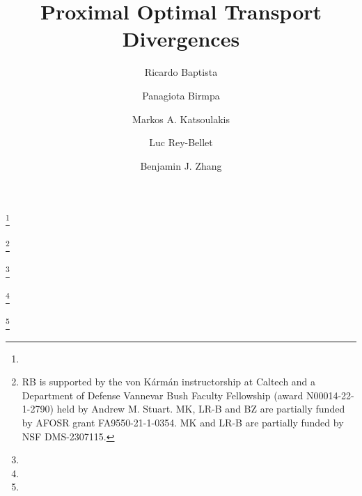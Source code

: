 \documentclass{amsart}
\theoremstyle{definition}
\theoremstyle{remark}
\numberwithin{equation}{section}
\begin{document}
\title{Proximal Optimal Transport Divergences}

\author[R. Baptista]{Ricardo Baptista}
\address{Computing and Mathematical Sciences, California Institute of Technology, Pasadena CA 91125, United States}
\thanks{}

\author[P. Birmpa]{Panagiota Birmpa}
\address{ Actuarial Mathematics \& Statistics,  School of Mathematical \& Computer Sciences,
Heriot-Watt University and Maxwell Institute, Edinburgh EH14 4AS, United Kingdom}
\thanks{RB is supported by the von K\'{a}rm\'{a}n instructorship at Caltech and a Department of Defense Vannevar Bush Faculty Fellowship (award N00014-22-1-2790) held by Andrew M. Stuart. MK, LR-B and BZ are partially funded by AFOSR grant FA9550-21-1-0354. MK and LR-B are
partially funded by NSF DMS-2307115.}

\author[M. A. Katsoulakis]{Markos A. Katsoulakis}
\address{ Department of Mathematics \& Statistics, University of Massachusetts Amherst, Amherst, MA 01003, United States}
\thanks{}
\author[L. Rey-Bellet]{Luc Rey-Bellet}
\address{ Department of Mathematics \& Statistics, University of Massachusetts Amherst, Amherst, MA 01003, United States}
\thanks{}

\author[B. J. Zhang]{Benjamin J. Zhang}
\address{Division of Applied Mathematics, Brown University, Providence, RI 02912, United States}
\thanks{}






\end{document}
